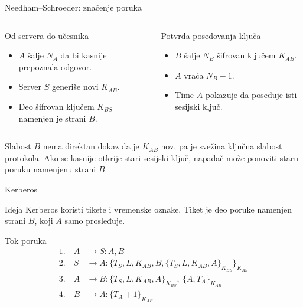 \documentclass[aspectratio=1610]{beamer}
\newcommand{\enc}[2]{\{#1\}_{#2}}
\begin{document}
\begin{frame}[t]{Needham--Schroeder: značenje poruka}
\small
\begin{columns}[T,onlytextwidth]
\begin{block}{Od servera do učesnika}
\begin{itemize}
    \item $A$ šalje $N_A$ da bi kasnije prepoznala odgovor.
    \item Server $S$ generiše novi $K_{AB}$.
    \item Deo šifrovan ključem $K_{BS}$ namenjen je strani $B$.
\end{itemize}
\end{block}

\begin{block}{Potvrda posedovanja ključa}
\begin{itemize}
    \item $B$ šalje $N_B$ šifrovan ključem $K_{AB}$.
    \item $A$ vraća $N_B-1$.
    \item Time $A$ pokazuje da poseduje isti sesijski ključ.
\end{itemize}
\end{block}
\end{columns}

\vspace{0.3em}
\begin{alertblock}{Slabost}
$B$ nema direktan dokaz da je $K_{AB}$ nov, pa je svežina ključna slabost protokola. Ako se kasnije otkrije stari sesijski ključ, napadač može ponoviti staru poruku namenjenu strani $B$.
\end{alertblock}
\end{frame}

\begin{frame}[t]{Kerberos}
\scriptsize
\begin{block}{Ideja}
Kerberos koristi tikete i vremenske oznake. Tiket je deo poruke namenjen strani $B$, koji $A$ samo prosleđuje.
\end{block}

\begin{block}{Tok poruka}
\[
\begin{aligned}
1.\quad A &\rightarrow S : A, B \\
2.\quad S &\rightarrow A : \enc{T_S, L, K_{AB}, B, \enc{T_S, L, K_{AB}, A}{K_{BS}}}{K_{AS}} \\
3.\quad A &\rightarrow B : \enc{T_S, L, K_{AB}, A}{K_{BS}},\ \enc{A,T_A}{K_{AB}} \\
4.\quad B &\rightarrow A : \enc{T_A+1}{K_{AB}}
\end{aligned}
\]
\end{block}


\end{frame}
\end{document}
